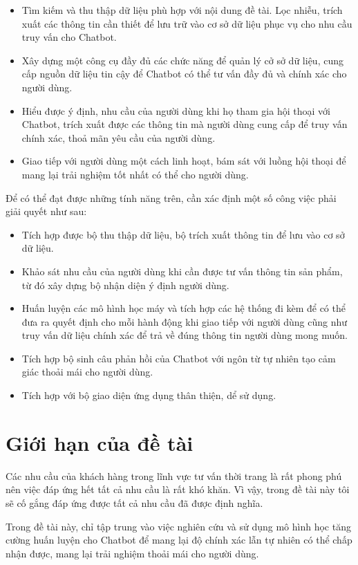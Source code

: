 \begin{itemize}
    \item Tìm kiếm và thu thập dữ liệu phù hợp với nội dung đề tài. Lọc nhiễu, trích xuất các thông tin cần thiết để lưu trữ vào cơ sở dữ liệu phục vụ cho nhu cầu truy vấn cho Chatbot.
    \item Xây dựng một công cụ đầy đủ các chức năng để quản lý cở sở dữ liệu, cung cấp nguồn dữ liệu tin cậy để Chatbot có thể tư vấn đầy đủ và chính xác cho người dùng.
    \item Hiểu được ý định, nhu cầu của người dùng khi họ tham gia hội thoại với Chatbot, trích xuất được các thông tin mà người dùng cung cấp để truy vấn chính xác, thoả mãn yêu cầu của người dùng.
    \item Giao tiếp với người dùng một cách linh hoạt, bám sát với luồng hội thoại để mang lại trải nghiệm tốt nhất có thể cho người dùng.
\end{itemize}

Để có thể đạt được những tính năng trên, cần xác định một số công việc phải giải quyết như sau:

\begin{itemize}
    \item Tích hợp được bộ thu thập dữ liệu, bộ trích xuất thông tin để lưu vào cơ sở dữ liệu.
    \item Khảo sát nhu cầu của người dùng khi cần được tư vấn thông tin sản phẩm, từ đó xây dựng bộ nhận diện ý định người dùng.
    \item Huấn luyện các mô hình học máy và tích hợp các hệ thống đi kèm để có thể đưa ra quyết định cho mỗi hành động khi giao tiếp với người dùng cũng như truy vấn dữ liệu chính xác để trả về đúng thông tin người dùng mong muốn.
    \item Tích hợp bộ sinh câu phản hồi của Chatbot với ngôn từ tự nhiên tạo cảm giác thoải mái cho người dùng.
    \item Tích hợp với bộ giao diện ứng dụng thân thiện, dể sử dụng.
\end{itemize}

\section{Giới hạn của đề tài}
Các nhu cầu của khách hàng trong lĩnh vực tư vấn thời trang là rất phong phú nên việc đáp ứng hết tất cả nhu cầu là rất khó khăn. Vì vậy, trong đề tài này tôi sẽ cố gắng đáp ứng được tất cả nhu cầu đã được định nghĩa.

Trong đề tài này, chỉ tập trung vào việc nghiên cứu và sử dụng mô hình học tăng cường huấn luyện cho Chatbot để mang lại độ chính xác lẫn tự nhiên có thể chấp nhận được, mang lại trải nghiệm thoải mái cho người dùng.

